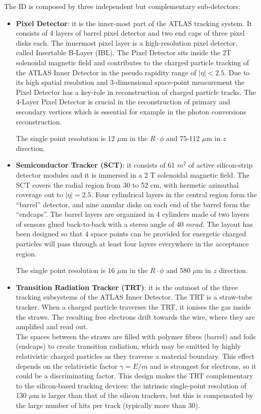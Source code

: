\documentclass[a4paper, oneside, 11pt, openright]{book}
\begin{document}
					The ID is composed by three independent but complementary sub-detectors: 
					\begin{itemize}
						\item  \textbf{Pixel Detector}: \cite{ATLAS TDR} \cite{Inner Detector}
						it is  the  inner-most  part  of  the  ATLAS  tracking  system. It consists of 4 layers of barrel pixel detector and two end caps of three pixel disks each. The innermost pixel layer is a high-resolution pixel detector,  called Insertable B-Layer (IBL). The Pixel Detector sits inside the 2T solenoidal magnetic field and contributes to the charged particle tracking of the ATLAS Inner Detector in the pseudo rapidity range of $|\eta|<2.5$. Due to its high spatial resolution and 3-dimensional space-point measurement the Pixel Detector has a key-role in reconstruction of charged particle tracks.  The 4-Layer Pixel Detector is crucial in the reconstruction of primary and secondary vertices which is essential for example in the photon conversions reconstruction. 
						
						The single point resolution is 12 $\mu$m in the $R\cdot\phi$ and 75-112 $\mu$m in $z$ direction.
						\item \textbf{Semiconductor Tracker (SCT)}: \cite{ATLAS TDR} \cite{SCT}
						it consists of 61 $m^2$ of active silicon-strip detector modules and it is immersed in a 2 T solenoidal magnetic field. The  SCT  covers  the  radial  region  from  30  to  52  cm,  with  hermetic  azimuthal  coverage  out  to $|\eta|=2.5$. Four cylindrical layers in the central region form the “barrel” detector, and nine annular disks on each end of the barrel form the “endcaps”. The barrel layers are organized in 4 cylinders made of two layers of sensors glued back-to-back with a stereo angle of 40 $mrad$. The layout has been designed so that 4 space points can be provided for energetic charged particles will pass through at least four layers everywhere in the acceptance region. 
						
						The single point resolution is 16 $\mu$m in the $R\cdot\phi$ and 580 $\mu$m in $z$ direction.
						\item \textbf{Transition Radiation Tracker (TRT)}: \cite{ATLAS TDR} \cite{TRT}
						it is the outmost of the three tracking subsystems of the ATLAS Inner Detector. The TRT is a straw-tube tracker. When a charged particle traverses the TRT, it ionises the gas inside the straws. The resulting free electrons drift towards the wire, where they are amplified and read out.\\
						The spaces between the straws are filled with polymer fibres (barrel) and foils (endcaps) to create transition radiation, which may be emitted by highly relativistic charged particles as they traverse a material boundary.   This effect depends on the relativistic factor $\gamma=E/m$ and is strongest for electrons, so it could be a discriminating factor.
						This design  makes the TRT complementary to  the silicon-based tracking devices:  the intrinsic single-point resolution of 130 $\mu$m is larger than that of the silicon trackers, but this is compensated by the large number of hits per track (typically more than 30). 
					\end{itemize}
\end{document}
